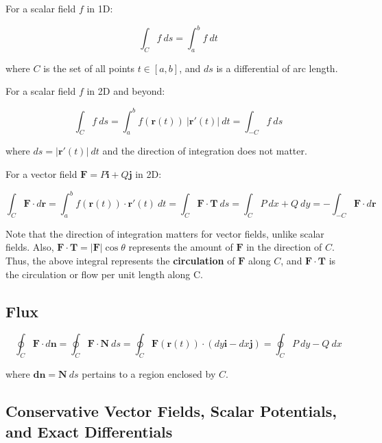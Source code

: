 For a scalar field $f$ in 1D:

\begin{equation*}
    \int_C f~ds = \int_a^b f~dt
\end{equation*}

where $C$ is the set of all points $t \in [a,b]$, and $ds$ is a differential of arc length.

\vsp

For a scalar field $f$ in 2D and beyond:

\begin{equation*}
    \int_C f~ds = \int_a^b f(\mathbf{r}(t))~|\mathbf{r}'(t)|~dt = \int_{-C} f~ds
\end{equation*}

where $ds = |\mathbf{r}'(t)|~dt$ and the direction of integration does not matter.

\vsp

For a vector field $\mathbf{F} = P\mathbf{i} + Q\mathbf{j}$ in 2D:

\begin{equation*}
    \int_C \mathbf{F}\cdot d\mathbf{r} = \int_a^b f(\mathbf{r}(t)) \cdot \mathbf{r}'(t)~dt = \int_C \mathbf{F}\cdot \mathbf{T}~ds = \int_C P~dx + Q~dy = -\int_{-C} \mathbf{F}\cdot d\mathbf{r}
\end{equation*}

\vsp

Note that the direction of integration matters for vector fields, unlike scalar fields. Also, $\mathbf{F}\cdot \mathbf{T}=|\mathbf{F}|\cos\theta$ represents the amount of $\mathbf{F}$ in the direction of $C$. Thus, the above integral represents the \textbf{circulation} of $\mathbf{F}$ along $C$, and $\mathbf{F} \cdot \mathbf{T}$ is the circulation or flow per unit length along C.

\subsection{Flux}

\begin{equation*}
    \oint_C \mathbf{F}\cdot d\mathbf{n} = \oint_C \mathbf{F}\cdot \mathbf{N}~ds = \oint_C \mathbf{F}(\mathbf{r}(t))\cdot (dy\mathbf{i} - dx\mathbf{j}) = \oint_C P~dy - Q~dx
\end{equation*}

where $\mathbf{dn} = \mathbf{N}~ds$ pertains to a region enclosed by $C$.

\subsection{Conservative Vector Fields, Scalar Potentials, and Exact Differentials}


